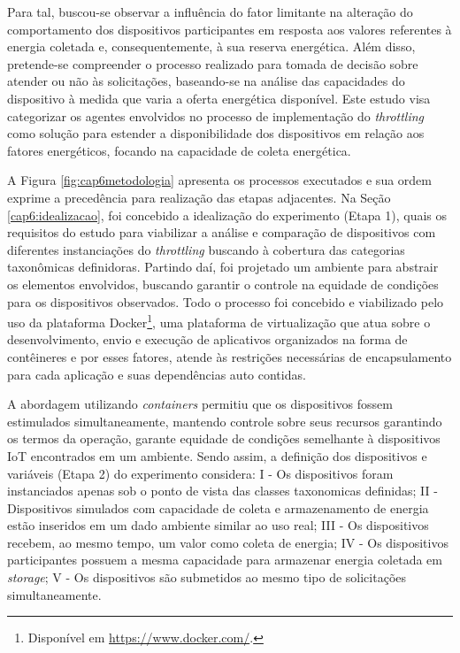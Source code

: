 Para tal, buscou-se observar a influência do fator limitante na alteração do comportamento dos dispositivos participantes em resposta aos valores referentes à energia coletada e, consequentemente, à sua reserva energética. Além disso, pretende-se compreender o processo realizado para tomada de decisão sobre atender ou não às solicitações, baseando-se na análise das capacidades do dispositivo à medida que varia a oferta energética disponível. Este estudo visa categorizar os agentes envolvidos no processo de implementação do \textit{throttling} como solução para estender a disponibilidade dos dispositivos em relação aos fatores energéticos, focando na capacidade de coleta energética.

A Figura \ref{fig:cap6metodologia} apresenta os processos executados e sua ordem exprime a precedência para realização das etapas adjacentes. Na Seção \ref{cap6:idealizacao}, foi concebido a idealização do experimento (Etapa 1), quais os requisitos do estudo para viabilizar a análise e comparação de dispositivos com diferentes instanciações do \textit{throttling} buscando à cobertura das categorias taxonômicas definidoras. Partindo daí, foi projetado um ambiente para abstrair os elementos envolvidos, buscando garantir o controle na equidade de condições para os dispositivos observados. Todo o processo foi concebido e viabilizado pelo uso da plataforma Docker\footnote{Disponível em \url{https://www.docker.com/}.}, uma plataforma de virtualização que atua sobre o desenvolvimento, envio e execução de aplicativos organizados na forma de contêineres e por esses fatores, atende às restrições necessárias de encapsulamento para cada aplicação e suas dependências auto contidas.  

A abordagem utilizando \textit{containers} permitiu que os dispositivos fossem estimulados simultaneamente, mantendo controle sobre seus recursos garantindo os termos da operação, garante equidade de condições semelhante à dispositivos \acs{IoT} encontrados em um ambiente. Sendo assim, a definição dos dispositivos e variáveis (Etapa 2) do experimento considera:  I - Os dispositivos foram instanciados apenas sob o ponto de vista das classes taxonomicas definidas; II - Dispositivos simulados com capacidade de coleta e armazenamento de energia estão inseridos em um dado ambiente similar ao uso real; III - Os dispositivos recebem, ao mesmo tempo, um valor como coleta de energia; IV - Os dispositivos participantes possuem a mesma capacidade para armazenar energia coletada em \textit{storage}; V - Os dispositivos são submetidos ao mesmo tipo de solicitações simultaneamente.

